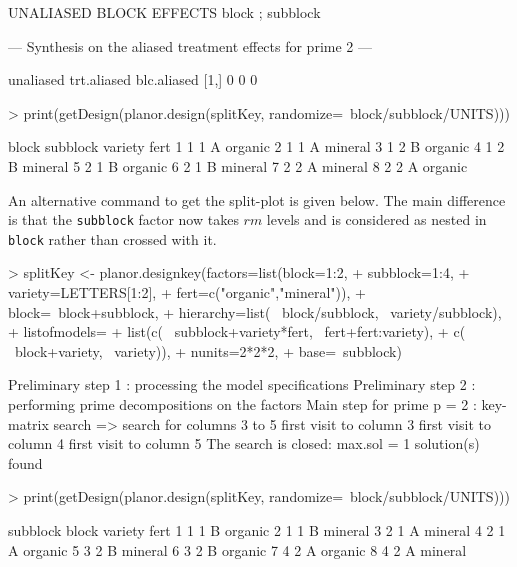 \documentclass[a4paper]{article}
\begin{document}
\begin{Schunk}
\begin{Soutput}
UNALIASED BLOCK EFFECTS
block ; subblock


--- Synthesis on the aliased treatment effects for prime  2  ---

     unaliased trt.aliased blc.aliased
[1,]         0           0           0
\end{Soutput}
\begin{Sinput}
> print(getDesign(planor.design(splitKey, randomize=~block/subblock/UNITS)))
\end{Sinput}
\begin{Soutput}
  block subblock variety    fert
1     1        1       A organic
2     1        1       A mineral
3     1        2       B organic
4     1        2       B mineral
5     2        1       B organic
6     2        1       B mineral
7     2        2       A mineral
8     2        2       A organic
\end{Soutput}
\end{Schunk}

An alternative command to get the split-plot is given below. The main
difference is that the \texttt{subblock} factor now takes $rm$ levels
and is considered as nested in \texttt{block} rather than crossed with
it.
\begin{Schunk}
\begin{Sinput}
> splitKey <- planor.designkey(factors=list(block=1:2,
+                                subblock=1:4,
+                                variety=LETTERS[1:2],
+                                fert=c("organic","mineral")), 
+                              block=~block+subblock,
+                              hierarchy=list( ~block/subblock, ~variety/subblock), 
+                              listofmodels=
+                              list(c( ~subblock+variety*fert, ~fert+fert:variety),
+                                   c( ~block+variety,               ~variety)), 
+                              nunits=2*2*2, 
+                              base=~subblock)
\end{Sinput}
\begin{Soutput}
Preliminary step 1 : processing the model specifications
Preliminary step 2 : performing prime decompositions on the factors
Main step for prime p = 2 : key-matrix search
  => search for columns 3 to 5 
      first visit to column 3 
      first visit to column 4 
      first visit to column 5 
The search is closed: max.sol =  1 solution(s) found 
\end{Soutput}
\begin{Sinput}
> print(getDesign(planor.design(splitKey, randomize=~block/subblock/UNITS)))
\end{Sinput}
\begin{Soutput}
  subblock block variety    fert
1        1     1       B organic
2        1     1       B mineral
3        2     1       A mineral
4        2     1       A organic
5        3     2       B mineral
6        3     2       B organic
7        4     2       A organic
8        4     2       A mineral
\end{Soutput}
\end{Schunk}
\end{document}
